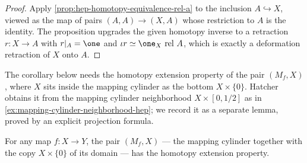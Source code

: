 \begin{proof}
\leanok
Apply \cref{prop:hep-homotopy-equivalence-rel-a} to the inclusion $A \hookrightarrow X$,
viewed as the map of pairs $(A,A) \to (X,A)$ whose restriction to $A$ is the identity.
The proposition upgrades the given homotopy inverse to a retraction $r : X \to A$ with
$r|_A = \one$ and $\iota r \simeq \one_X \rel A$, which is exactly a deformation
retraction of $X$ onto $A$.
\end{proof}

The corollary below needs the homotopy extension property of the pair $(M_f, X)$,
where $X$ sits inside the mapping cylinder as the bottom $X \times \{0\}$. Hatcher
obtains it from the mapping cylinder neighborhood $X \times [0,1/2]$ as in
\cref{ex:mapping-cylinder-neighborhood-hep}; we record it as a separate lemma, proved
by an explicit projection formula.

\begin{lemma}
\label{lem:mapping-cylinder-pair-hep}
\leanok
{}
For any map $f : X \to Y$, the pair $(M_f, X)$ — the mapping cylinder together with
the copy $X \times \{0\}$ of its domain — has the homotopy extension property.
\end{lemma}

